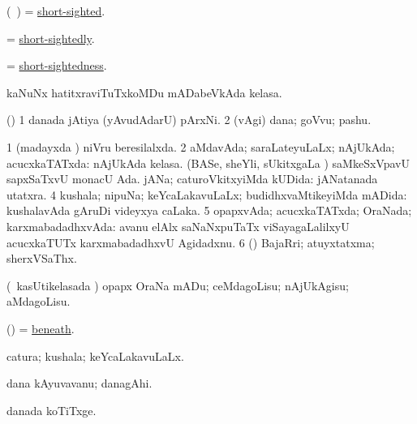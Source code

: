 \bentry
{}
\gl{\gu}
\bmng
(\kanmu\ \ame) = \hyperref{kandict_s.pdf}{S}{short-sighted}{short-sighted}. 
\emng
\eentry

\bentry
{}
\gl{\kirxvi}
\bmng
= \hyperref{kandict_s.pdf}{S}{short-sightedly}{short-sightedly}.
\emng
\eentry

\bentry
{}
\gl{\nA}
\bmng
= \hyperref{kandict_s.pdf}{S}{short-sightedness}{short-sightedness}. 
\emng
\eentry

\bentry
{}
\gl{\nA}
\bmng
kaNuNx hatitxraviTuTxkoMDu mADabeVkAda kelasa. 
\emng
\eentry

\bentry
{}
\gl{\nA}
\bmng
(\pArxparx) 
\bnum
\num{1} danada jAtiya (yAvudAdarU) pArxNi. 
\num{2} (\bava vAgi) dana; goVvu; pashu. 
\enum
\emng
\eentry

\bentry
{}
\gl{\gu}
\bmng
\bnum
\num{1} (madayxda \vi) niVru beresilalxda. 
\num{2} aMdavAda; saraLateyuLaLx; nAjUkAda; acucxkaTATxda:  nAjUkAda kelasa. 
 (BASe, sheYli, sUkitxgaLa \vi) 
\banum
{} saMkeSxVpavU sapxSaTxvU monacU Ada. 
 jANa; caturoVkitxyiMda kUDida:  jANatanada utatxra. 
\eanum
\numie
\num{4} kushala; nipuNa; keYcaLakavuLaLx; budidhxvaMtikeyiMda mADida:  kushalavAda gAruDi videyxya caLaka. 
\num{5} opapxvAda; acucxkaTATxda; OraNada; karxmabadadhxvAda:  avanu elAlx saNaNxpuTaTx viSayagaLalilxyU acucxkaTUTx karxmabadadhxvU Agidadxnu. 
\num{6} (\ame) BajaRri; atuyxtatxma; sherxVSaThx. 
\enum
\emng
\eentry

\bentry
{}
\gl{\sakirx}
\bmng
(\kanmu\ kasUtikelasada \vi) opapx OraNa mADu; ceMdagoLisu; nAjUkAgisu; aMdagoLisu. 
\emng
\eentry

\bentry
{}
\gl{\upa}
\bmng
(\kAparx) = \hyperref{kandict_b.pdf}{B}{beneath(1)}{beneath}. 
\emng
\eentry

\bentry
{}
\gl{\gu}
\bmng
catura; kushala; keYcaLakavuLaLx. 
\emng
\eentry

\bentry
{}
\gl{\nA}
\bmng
dana kAyuvavanu; danagAhi. 
\emng
\eentry

\bentry
{}
\gl{\nA}
\bmng
danada koTiTxge. 
\emng
\eentry

